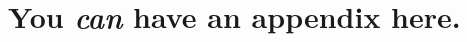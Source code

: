 \documentclass{article}
\theoremstyle{plain}
\theoremstyle{definition}
\theoremstyle{remark}
\begin{document}
%
%
%
%
%
%
%
%





\newpage
\appendix
\onecolumn
\section{You \emph{can} have an appendix here.}
\end{document}
